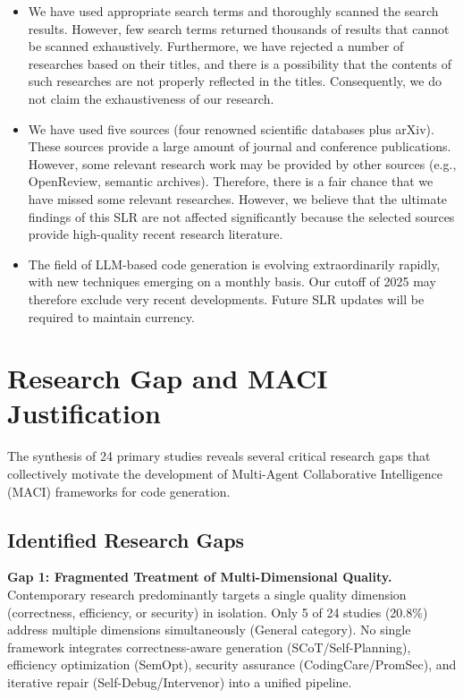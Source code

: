 \documentclass[11pt,a4paper]{article}
\begin{document}
\begin{itemize}[leftmargin=*]
\item We have used appropriate search terms and thoroughly scanned the search results. However, few search terms returned thousands of results that cannot be scanned exhaustively. Furthermore, we have rejected a number of researches based on their titles, and there is a possibility that the contents of such researches are not properly reflected in the titles. Consequently, we do not claim the exhaustiveness of our research.

\item We have used five sources (four renowned scientific databases plus arXiv). These sources provide a large amount of journal and conference publications. However, some relevant research work may be provided by other sources (e.g., OpenReview, semantic archives). Therefore, there is a fair chance that we have missed some relevant researches. However, we believe that the ultimate findings of this SLR are not affected significantly because the selected sources provide high-quality recent research literature.

\item The field of LLM-based code generation is evolving extraordinarily rapidly, with new techniques emerging on a monthly basis. Our cutoff of 2025 may therefore exclude very recent developments. Future SLR updates will be required to maintain currency.
\end{itemize}

\section{Research Gap and MACI Justification}
\label{sec:research_gap}

The synthesis of 24 primary studies reveals several critical research gaps that collectively motivate the development of Multi-Agent Collaborative Intelligence (MACI) frameworks for code generation.

\subsection{Identified Research Gaps}

\textbf{Gap 1: Fragmented Treatment of Multi-Dimensional Quality.} Contemporary research predominantly targets a single quality dimension (correctness, efficiency, or security) in isolation. Only 5 of 24 studies (20.8\%) address multiple dimensions simultaneously (General category). No single framework integrates correctness-aware generation (SCoT/Self-Planning), efficiency optimization (SemOpt), security assurance (CodingCare/PromSec), and iterative repair (Self-Debug/Intervenor) into a unified pipeline.
\end{document}
